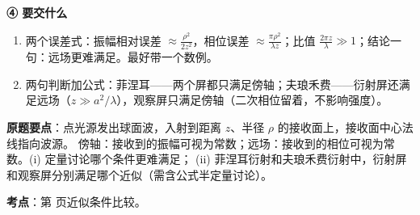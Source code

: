 \begin{idea}[读题：这道题在说什么]
\textbf{④ 要交什么}
\begin{enumerate}[label=(\roman*)]
\item 两个误差式：振幅相对误差 $\approx\frac{\rho^2}{2z^2}$，相位误差 $\approx\frac{\pi\rho^2}{\lambda z}$；比值 $\frac{2\pi z}{\lambda}\gg1$；结论一句：远场更难满足。最好带一个数例。
\item 两句判断加公式：菲涅耳——两个屏都只满足傍轴；夫琅禾费——衍射屏还满足远场（$z\gg a^2/\lambda$），观察屏只满足傍轴（二次相位留着，不影响强度）。
\end{enumerate}
\end{idea}

\noindent\textbf{原题要点}：点光源发出球面波，入射到距离 $z$、半径 $\rho$ 的接收面上，接收面中心法线指向波源。
傍轴：接收到的振幅可视为常数；远场：接收到的相位可视为常数。(i) 定量讨论哪个条件更难满足；
(ii) 菲涅耳衍射和夫琅禾费衍射中，衍射屏和观察屏分别满足哪个近似（需含公式半定量讨论）。

\textbf{考点}：第 \pageref{box:approx} 页近似条件比较。

